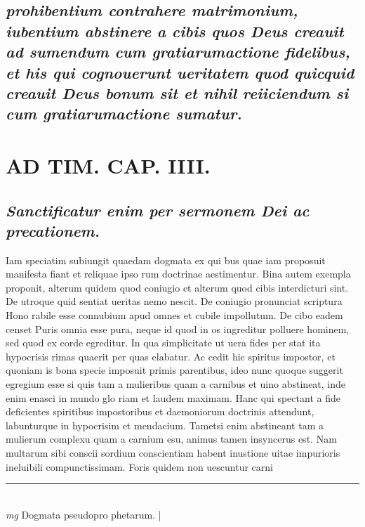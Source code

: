 \documentclass{article}
\begin{document}
\begin{pages}
\subsection*{\textit{prohibentium contrahere matrimonium, iubentium abstinere a cibis quos Deus creauit ad sumendum cum gratiarumactione fidelibus, et his qui cognouerunt ueritatem quod quicquid creauit Deus bonum sit et nihil reiiciendum si cum gratiarumactione sumatur. }}
\section*{AD TIM. CAP. IIII. }
\marginpar{[ p.138 ]}
{}
\subsection*{\textit{Sanctificatur enim per sermonem Dei ac precationem. }}\pstart Iam speciatim subiungit quaedam dogmata ex qui bus quae iam proposuit manifesta fiant et reliquae ipso rum doctrinae aestimentur. Bina autem exempla proponit, alterum quidem quod coniugio et alterum quod cibis interdicturi sint. De utroque quid sentiat ueritas nemo nescit. De coniugio pronunciat scriptura Hono rabile esse connubium apud omnes et cubile impollutum. De cibo eadem censet Puris omnia esse pura, neque id quod in os ingreditur polluere hominem, sed quod ex corde egreditur. In qua simplicitate ut uera fides per stat ita hypocrisis rimas quaerit per quas elabatur. Ac cedit hic spiritus impostor, et quoniam is bona specie imposuit primis parentibus, ideo nunc quoque suggerit egregium esse si quis tam a mulieribus quam a carnibus et uino abstineat, inde enim enasci in mundo glo riam et laudem maximam. Hanc qui spectant a fide deficientes spiritibus impostoribus et daemoniorum doctrinis attendunt, labunturque in hypocrisim et mendacium. Tametsi enim abstineant tam a mulierum complexu quam a carnium esu, animus tamen insyncerus est. Nam multarum sibi conscii sordium conscientiam habent inustione uitae impurioris ineluibili compunctissimam. Foris quidem non uescuntur carni  \pend
\vspace{0.5cm}\noindent
\vspace{0.2cm}\rule{1cm}{0.2pt}\\ 
\hspace{0.2cm}\textit{mg}
\footnotesize Dogmata pseudopro phetarum. 
\normalsize| 

\end{pages}
\end{document}
